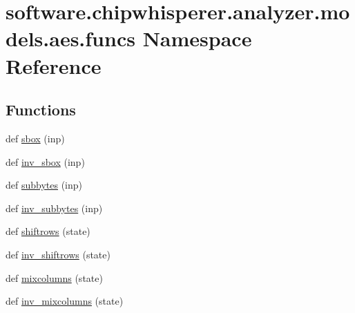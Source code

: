 \hypertarget{namespacesoftware_1_1chipwhisperer_1_1analyzer_1_1models_1_1aes_1_1funcs}{}\section{software.\+chipwhisperer.\+analyzer.\+models.\+aes.\+funcs Namespace Reference}
\label{namespacesoftware_1_1chipwhisperer_1_1analyzer_1_1models_1_1aes_1_1funcs}
\subsection*{Functions}
\begin{DoxyCompactItemize}
\item 
def \hyperlink{namespacesoftware_1_1chipwhisperer_1_1analyzer_1_1models_1_1aes_1_1funcs_a9335c0b10ef1748bf1a43d986584b6cc}{sbox} (inp)
\item 
def \hyperlink{namespacesoftware_1_1chipwhisperer_1_1analyzer_1_1models_1_1aes_1_1funcs_abd974ec608fb9868e7bed0e11facf526}{inv\+\_\+sbox} (inp)
\item 
def \hyperlink{namespacesoftware_1_1chipwhisperer_1_1analyzer_1_1models_1_1aes_1_1funcs_a37c3bb10e993293ccac1cb8edec7f0d8}{subbytes} (inp)
\item 
def \hyperlink{namespacesoftware_1_1chipwhisperer_1_1analyzer_1_1models_1_1aes_1_1funcs_acaa9a286c2b5e715ffc847407fb47c30}{inv\+\_\+subbytes} (inp)
\item 
def \hyperlink{namespacesoftware_1_1chipwhisperer_1_1analyzer_1_1models_1_1aes_1_1funcs_a1c3450a55e448e4486e5d06814ece479}{shiftrows} (state)
\item 
def \hyperlink{namespacesoftware_1_1chipwhisperer_1_1analyzer_1_1models_1_1aes_1_1funcs_a0d759071fdfda31da81a8edc574d56e1}{inv\+\_\+shiftrows} (state)
\item 
def \hyperlink{namespacesoftware_1_1chipwhisperer_1_1analyzer_1_1models_1_1aes_1_1funcs_ad0e9a811fc7a951d860de1c7477e9c5b}{mixcolumns} (state)
\item 
def \hyperlink{namespacesoftware_1_1chipwhisperer_1_1analyzer_1_1models_1_1aes_1_1funcs_aa1464930dfd4c9e4ce752cfef5edc5fd}{inv\+\_\+mixcolumns} (state)
\end{DoxyCompactItemize}
